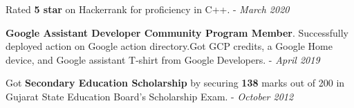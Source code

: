 
\begin{cventries}
  \cventry
     {} %
     {} %
     {} %
     {} %
    {
      \begin{cvitems} %
         \item {Rated \textbf{5 star} on Hackerrank for proficiency in C++. - \textit{March 2020}}
         \vspace{1.5 mm}
         \item{\textbf{Google Assistant Developer Community Program Member}. Successfully deployed action on Google action directory.Got GCP credits, a Google Home device, and Google assistant T-shirt from Google Developers. - \textit{April 2019} }
         \vspace{1.5mm}
         \item{Got \textbf{Secondary Education Scholarship} by securing \textbf{138} marks out of 200 in Gujarat State Education Board's Scholarship Exam. - \textit{October 2012} }
         \vspace{1.5mm}
    \end{cvitems}
    }
\end{cventries}
